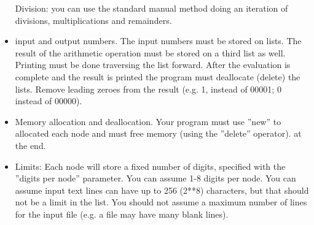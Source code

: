 \begin{itemize}
Division: you can use the standard manual method doing an iteration of divisions, multiplications and remainders.
\item input and output numbers.
The input numbers must be stored on lists. The result of the arithmetic operation must be stored on a
third list as well. Printing must be done traversing the list forward. After the evaluation is complete
and the result is printed the program must deallocate (delete) the lists. Remove leading zeroes from
the result (e.g. 1, instead of 00001; 0 instead of 00000).
\item Memory allocation and deallocation.
Your program must use ”new” to allocated each node and must free memory (using the ”delete”
operator). at the end.
\item Limits: Each node will store a fixed number of digits, specified with the ”digits per node” parameter.
You can assume 1-8 digits per node.
You can assume input text lines can have up to 256 (2**8) characters, but that should not be a limit in the list. You should not assume a maximum number of lines for the input file (e.g. a file may have
many blank lines).
\end{itemize}


% 



